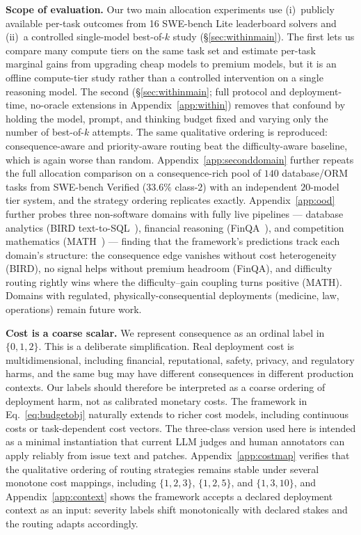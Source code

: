 \documentclass{article}
\begin{document}
\textbf{Scope of evaluation.} Our two main allocation experiments use
(i)~publicly available per-task outcomes from 16 SWE-bench Lite
leaderboard solvers and (ii)~a controlled single-model best-of-$k$
study (\S\ref{sec:withinmain}). The first lets us compare many compute
tiers on the same task set and estimate per-task marginal gains from
upgrading cheap models to premium models, but it is an offline
compute-tier study rather than a controlled intervention on a single
reasoning model. The second (\S\ref{sec:withinmain}; full protocol and
deployment-time, no-oracle extensions in Appendix~\ref{app:within})
removes that confound by holding the model, prompt, and thinking budget
fixed and varying only the number of best-of-$k$ attempts. The same qualitative ordering is reproduced: consequence-aware and
priority-aware routing beat the difficulty-aware baseline, which is
again worse than random. Appendix~\ref{app:seconddomain} further
repeats the full allocation comparison on a consequence-rich pool of
$140$ database/ORM tasks from SWE-bench Verified ($33.6\%$ class-$2$)
with an independent $20$-model tier system, and the strategy ordering
replicates exactly. Appendix~\ref{app:ood} further probes three
non-software domains with fully live pipelines --- database analytics
(BIRD text-to-SQL~\citep{li2023bird}), financial reasoning
(FinQA~\citep{chen2021finqa}), and competition mathematics
(MATH~\citep{hendrycks2021math}) --- finding that the framework's
predictions track each domain's structure: the consequence edge
vanishes without cost heterogeneity (BIRD), no signal helps without
premium headroom (FinQA), and difficulty routing rightly wins where
the difficulty--gain coupling turns positive (MATH). Domains with
regulated, physically-consequential deployments (medicine, law,
operations) remain future work.

\textbf{Cost is a coarse scalar.} We represent consequence as an
ordinal label in $\{0,1,2\}$. This is a deliberate simplification.
Real deployment cost is multidimensional, including financial,
reputational, safety, privacy, and regulatory harms, and the same bug
may have different consequences in different production contexts. Our
labels should therefore be interpreted as a coarse ordering of
deployment harm, not as calibrated monetary costs. The framework in
Eq.~\ref{eq:budgetobj} naturally extends to richer cost models,
including continuous costs or task-dependent cost vectors. The
three-class version used here is intended as a minimal instantiation
that current LLM judges and human annotators can apply reliably from
issue text and patches. Appendix~\ref{app:costmap} verifies that the
qualitative ordering of routing strategies remains stable under
several monotone cost mappings, including $\{1,2,3\}$, $\{1,2,5\}$,
and $\{1,3,10\}$, and Appendix~\ref{app:context} shows the
framework accepts a declared deployment context as an input:
severity labels shift monotonically with declared stakes and the
routing adapts accordingly.
\end{document}
